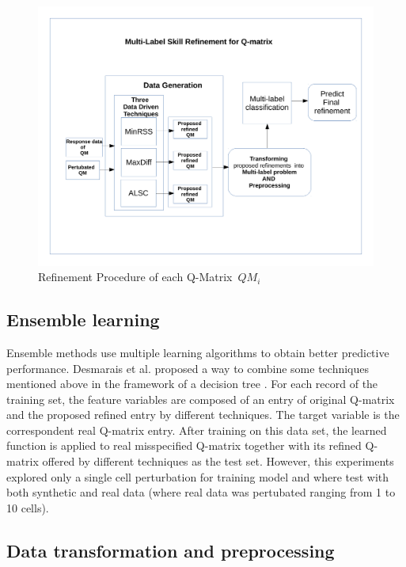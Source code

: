 \documentclass[11pt]{article}
\begin{document}
 \begin{figure}\label{fig:RP}
  \centering
    \includegraphics[width=100 mm ,scale=0.5]{graph/RP.pdf}
  \caption{Refinement Procedure of each Q-Matrix~$QM_i$ }
\end{figure} 

\subsection{Ensemble learning}

Ensemble methods use multiple learning algorithms to obtain better predictive performance. Desmarais et al. proposed a way to combine some techniques mentioned above in the framework of a decision tree \cite{desmarais2015combining}. For each record of the training set, the feature variables are composed of an entry of original Q-matrix and the proposed refined entry by different techniques. The target variable is the correspondent real Q-matrix entry. After training on this data set, the learned function is applied to real misspecified Q-matrix together with its refined Q-matrix offered by different techniques as the test set. However, this experiments explored only a single cell perturbation for training model and where test with both synthetic and real data (where real data was pertubated ranging from 1 to 10 cells).

\subsection{Data transformation and preprocessing}
\end{document}

